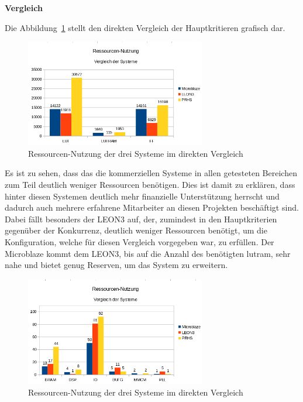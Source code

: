 \textbf{Vergleich}

Die Abbildung~\ref{fig:ressourcenresult} stellt den direkten Vergleich der Hauptkritieren grafisch dar.\\

\begin{figure}[H]
\centering
\includegraphics[width=0.7\textwidth]{Hauptteil/ressourcenresult.png}
\caption{Ressourcen-Nutzung der drei Systeme im direkten Vergleich}
\label{fig:ressourcenresult}
\end{figure}

Es ist zu sehen, dass das die kommerziellen Systeme in allen getesteten Bereichen zum Teil deutlich weniger Ressourcen benötigen.
Dies ist damit zu erklären, dass hinter diesen Systemen deutlich mehr finanzielle Unterstützung herrscht und dadurch auch mehrere
erfahrene Mitarbeiter an diesen Projekten beschäftigt sind.\\
Dabei fällt besonders der LEON3 auf, der, zumindest in den Hauptkriterien gegenüber der Konkurrenz, deutlich weniger Ressourcen
benötigt, um die Konfiguration, welche für diesen Vergleich vorgegeben war, zu erfüllen. Der Microblaze kommt dem LEON3, bis auf
die Anzahl des benötigten \ac{lutram}, sehr nahe und bietet genug Reserven, um das System zu erweitern.\\

\begin{figure}[H]
\centering
\includegraphics[width=0.7\textwidth]{Hauptteil/ressourcenresult1.png}
\caption{Ressourcen-Nutzung der drei Systeme im direkten Vergleich}
\label{fig:ressourcenresult1}
\end{figure}


